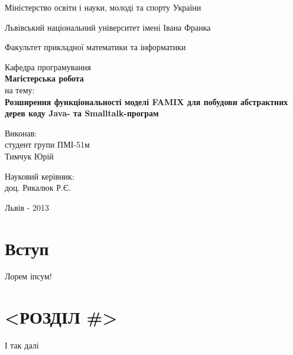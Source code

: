 \documentclass[12pt,a4paper]{article}
\begin{document}

\thispagestyle{empty}
\setlength{\parindent}{1.5cm}
\fontsize{14pt}{6mm}\selectfont

\begin{center}
  Міністерство освіти і науки, молоді та спорту України
  
  Львівський національний університет імені Івана Франка

  Факультет прикладної математики та інформатики

  Кафедра програмування\\[5cm]

  {\bfseries\Large Магістерська робота}\\[0.5cm]
  на тему:\\[0.5cm]
  {\bfseries\Large Розширення функціональності моделі FAMIX для побудови абстрактних дерев коду Java- та Smalltalk-програм}\\[5cm]

  \begin{flushleft}
    Виконав:\\
    студент групи ПМІ-51м\\
    Тимчук Юрій\linebreak

    Науковий керівник:\\
    доц. Рикалюк Р.Є.
    
  \end{flushleft}

  \vspace{2cm}
  Львів - 2013 
\end{center}

\clearpage

\fontsize{14pt}{6mm}\selectfont

\newcommand{\vect}[1]{(#1_1,#1_2,\dots,#1_n)}

\tableofcontents
\clearpage
{}

\section{Вступ}

Лорем іпсум!

\clearpage

\section{<РОЗДІЛ \#>}

І так далі
\end{document}
